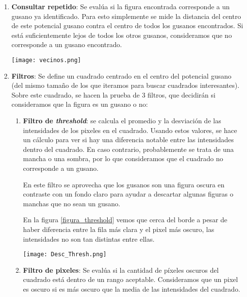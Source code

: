 \documentclass{article}
\begin{document}
\begin{enumerate}
\item \textbf{Consultar repetido}: Se evalúa si la figura encontrada corresponde a un gusano ya identificado. Para esto simplemente se mide la distancia del centro de este potencial gusano contra el centro de todos los gusanos encontrados. Si está suficientemente lejos de todos los otros gusanos, consideramos que no corresponde a un gusano encontrado.

\begin{figure*}[h]
    \centering
    \texttt{[image: vecinos.png]}
    \caption{Dos cuadrados encuentran el mismo gusano}
    \label{label_vecinos}
\end{figure*}

\item \textbf{Filtros}: Se define un cuadrado centrado en el centro del potencial gusano (del mismo tamaño de los que iteramos para buscar cuadrados interesantes). Sobre este cuadrado, se hacen la prueba de 3 filtros, que decidirán si consideramos que la figura es un gusano o no:

\begin{enumerate}
\item \textbf{Filtro de \emph{threshold}}: se calcula el promedio y la desviación de las intensidades de los pixeles en el cuadrado. Usando estos valores, se hace un cálculo para ver si hay una diferencia notable entre las intensidades dentro del cuadrado. En caso contrario, probablemente se trata de una mancha o una sombra, por lo que consideramos que el cuadrado no corresponde a un gusano. 

\hspace{0.2cm} En este filtro se aprovecha que los gusanos son una figura oscura en contraste con un fondo claro para ayudar a descartar algunas figuras o manchas que no sean un gusano.

\hspace{0.2cm} En la figura \ref{figura_threshold} vemos que cerca del borde a pesar de haber diferencia entre la fila más clara y el pixel más oscuro, las intensidades no son tan distintas entre ellas. 
\begin{figure*}[h]
    \centering
    \texttt{[image: Desc\_Thresh.png]}
    \caption{Cuadrados interesantes en los bordes}
    \label{figura_threshold}
\end{figure*}

\item \textbf{Filtro de pixeles}: Se evalúa si la cantidad de píxeles oscuros del cuadrado está dentro de un rango aceptable. Consideramos que un pixel es oscuro si es más oscuro que la media de las intensidades del cuadrado.


\end{enumerate}
\end{enumerate}
\end{document}
